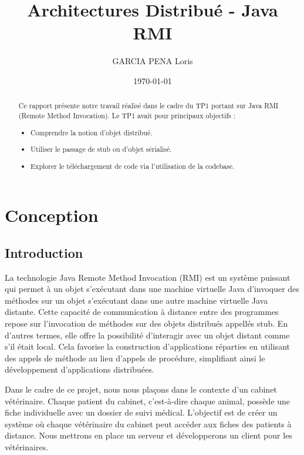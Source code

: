 \documentclass{article} %
\title{Architectures Distribué - Java RMI}
\author{GARCIA PENA Loris}
\date{\today} %
\begin{document}

\maketitle %

\begin{abstract}
    Ce rapport présente notre travail réalisé dans le cadre du TP1 portant sur Java RMI (Remote Method Invocation). Le TP1 avait pour principaux objectifs :

    \begin{itemize}
        \item Comprendre la notion d'objet distribué.
        \item Utiliser le passage de stub ou d'objet sérialisé.
        \item Explorer le téléchargement de code via l'utilisation de la codebase.
    \end{itemize}
\end{abstract}

\tableofcontents

\newpage %

\section{Conception}

\subsection{Introduction}

La technologie Java Remote Method Invocation (RMI) est un système puissant qui permet à un objet s'exécutant dans une machine virtuelle
Java d'invoquer des méthodes sur un objet s'exécutant dans une autre machine virtuelle Java distante. Cette capacité de communication à distance
entre des programmes repose sur l'invocation de méthodes sur des objets distribués appellés stub.
En d'autres termes, elle offre la possibilité d'interagir avec un objet distant comme s'il était local.
Cela favorise la construction d'applications réparties en utilisant des appels de méthode au lieu d'appels de procédure,
simplifiant ainsi le développement d'applications distribuées.

Dans le cadre de ce projet, nous nous plaçons dans le contexte d'un cabinet vétérinaire.
Chaque patient du cabinet, c'est-à-dire chaque animal, possède une fiche individuelle avec un dossier de suivi médical.
L'objectif est de créer un système où chaque vétérinaire du cabinet peut accéder aux fiches des patients à distance.
Nous mettrons en place un serveur et développerons un client pour les vétérinaires.
\end{document}
